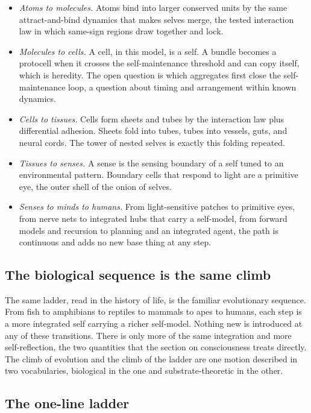 \begin{itemize}
  \item \emph{Atoms to molecules.} Atoms bind into larger conserved units by the same attract-and-bind dynamics
  that makes selves merge, the tested interaction law in which same-sign regions draw together and lock.
  \item \emph{Molecules to cells.} A cell, in this model, is a self. A bundle becomes a protocell when it crosses
  the self-maintenance threshold and can copy itself, which is heredity. The open question is which aggregates
  first close the self-maintenance loop, a question about timing and arrangement within known dynamics.
  \item \emph{Cells to tissues.} Cells form sheets and tubes by the interaction law plus differential adhesion.
  Sheets fold into tubes, tubes into vessels, guts, and neural cords. The tower of nested selves is exactly this
  folding repeated.
  \item \emph{Tissues to senses.} A sense is the sensing boundary of a self tuned to an environmental pattern.
  Boundary cells that respond to light are a primitive eye, the outer shell of the onion of selves.
  \item \emph{Senses to minds to humans.} From light-sensitive patches to primitive eyes, from nerve nets to
  integrated hubs that carry a self-model, from forward models and recursion to planning and an integrated agent,
  the path is continuous and adds no new base thing at any step.
\end{itemize}

\subsection{The biological sequence is the same climb}

The same ladder, read in the history of life, is the familiar evolutionary sequence. From fish to amphibians to
reptiles to mammals to apes to humans, each step is a more integrated self carrying a richer self-model. Nothing
new is introduced at any of these transitions. There is only more of the same integration and more self-reflection,
the two quantities that the section on consciousness treats directly. The climb of evolution and the climb of the
ladder are one motion described in two vocabularies, biological in the one and substrate-theoretic in the other.

\subsection{The one-line ladder}

